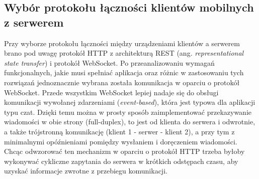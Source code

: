 \documentclass[../main.tex]{subfiles}
\begin{document}
\subsection{Wybór protokołu łączności klientów mobilnych z serwerem}

Przy wyborze protokołu łączności między urządzeniami klientów a serwerem brano pod uwagę protokół HTTP z architekturą REST (ang. \textit{representational state transfer}) i protokół WebSocket. Po przeanalizowaniu wymagań funkcjonalnych, jakie musi spełniać aplikacja oraz różnic w zastosowaniu tych rozwiązań\cite{rest_vs_websockets}\cite{rest_vs_websockets_2} jednoznacznie wybrana została komunikacja w oparciu o protokół WebSocket. Przede wszystkim WebSocket lepiej nadaje się do obsługi komunikacji wywołanej zdarzeniami (\textit{event-based}), która jest typowa dla aplikacji typu czat. Dzięki temu można w prosty sposób zaimplementować przekazywanie wiadomości w obie strony (full-duplex), to jest od klienta do serwera i odwrotnie, a także trójstronną komunikację (klient 1 - serwer - klient 2), a przy tym z minimalnymi opóźnieniami pomiędzy wysłaniem i doręczeniem wiadomości. Chcąc odwzorować ten mechanizm w oparciu o protokół HTTP trzeba byłoby wykonywać cykliczne zapytania do serwera w krótkich odstępach czasu, aby uzyskać informacje zwrotne z przebiegu komunikacji.
\end{document}
